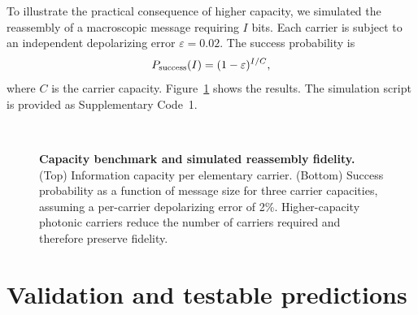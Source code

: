 \documentclass[11pt,a4paper]{article}
\begin{document}
To illustrate the practical consequence of higher capacity, we simulated the reassembly of a macroscopic message requiring $I$ bits. Each carrier is subject to an independent depolarizing error $\varepsilon=0.02$. The success probability is
\begin{equation}
P_{\rm success}(I) = (1-\varepsilon)^{I/C},
\end{equation}
where $C$ is the carrier capacity. Figure~\ref{fig:capacity} shows the results. The simulation script is provided as Supplementary Code~1.

\begin{figure}[H]
\centering
{}
\\[1em]
\caption{\textbf{Capacity benchmark and simulated reassembly fidelity.} (Top) Information capacity per elementary carrier. (Bottom) Success probability as a function of message size for three carrier capacities, assuming a per-carrier depolarizing error of 2\%. Higher-capacity photonic carriers reduce the number of carriers required and therefore preserve fidelity.}
\label{fig:capacity}
\end{figure}

\section*{Validation and testable predictions}
\end{document}
